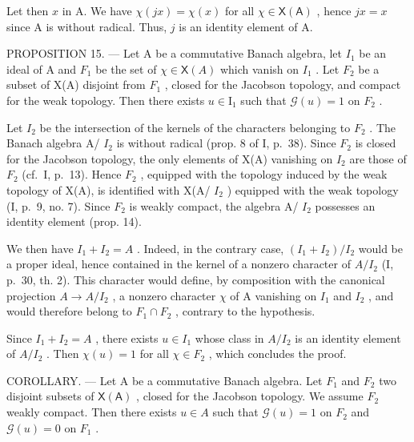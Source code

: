 Let then \(x\) in A. We have \(\chi(jx) = \chi(x)\) for all \(\chi \in \mathsf{X}(\mathsf{A})\) , hence \(jx = x\) since A is without radical. Thus, \(j\) is an identity element of A.

PROPOSITION 15. --- Let A be a commutative Banach algebra, let \(I_{1}\) be an ideal of A and \(F_{1}\) be the set of \(\chi \in \mathsf{X}(A)\) which vanish on \(I_{1}\) . Let \(F_{2}\) be a subset of X(A) disjoint from \(F_{1}\) , closed for the Jacobson topology, and compact for the weak topology. Then there exists \(u \in \text{I}_{1}\) such that \(\mathcal{G}(u) = 1\) on \(F_{2}\) .

Let \(I_{2}\) be the intersection of the kernels of the characters belonging to \(F_{2}\) . The Banach algebra A/ \(I_{2}\) is without radical (prop. 8 of I, p.~38). Since \(F_{2}\) is closed for the Jacobson topology, the only elements of X(A) vanishing on \(I_{2}\) are those of \(F_{2}\) (cf.~I, p.~13). Hence \(F_{2}\) , equipped with the topology induced by the weak topology of X(A), is identified with X(A/ \(I_{2}\) ) equipped with the weak topology (I, p.~9, no. 7). Since \(F_{2}\) is weakly compact, the algebra A/ \(I_{2}\) possesses an identity element (prop. 14).

We then have \(I_{1} + I_{2} = A\) . Indeed, in the contrary case, \((I_{1} + I_{2})/I_{2}\) would be a proper ideal, hence contained in the kernel of a nonzero character of \(A/I_{2}\) (I, p.~30, th. 2). This character would define, by composition with the canonical projection \(A \rightarrow A/I_{2}\) , a nonzero character \(\chi\) of A vanishing on \(I_{1}\) and \(I_{2}\) , and would therefore belong to \(F_{1} \cap F_{2}\) , contrary to the hypothesis.

Since \(I_{1} + I_{2} = A\) , there exists \(u \in I_{1}\) whose class in \(A/I_{2}\) is an identity element of \(A/I_{2}\) . Then \(\chi(u) = 1\) for all \(\chi \in F_{2}\) , which concludes the proof.

COROLLARY. --- Let A be a commutative Banach algebra. Let \(F_{1}\) and \(F_{2}\) two disjoint subsets of \(\mathsf{X}(\mathsf{A})\) , closed for the Jacobson topology. We assume \(F_{2}\) weakly compact. Then there exists \(u \in A\) such that \(\mathcal{G}(u) = 1\) on \(F_{2}\) and \(\mathcal{G}(u) = 0\) on \(F_{1}\) .

